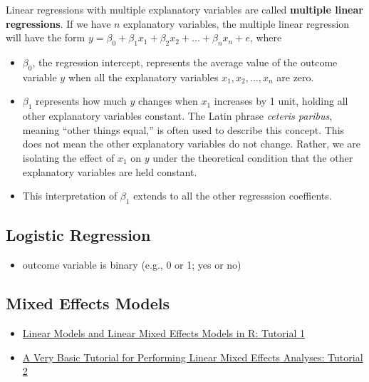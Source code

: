 \documentclass[]{book}
\providecommand{\tightlist}{%
  \setlength{\itemsep}{0pt}\setlength{\parskip}{0pt}}
\begin{document}
Linear regressions with multiple explanatory variables are called \textbf{multiple linear regressions}. If we have \(n\) explanatory variables, the multiple linear regression will have the form \(y=\beta_0 + \beta_1 x_1 + \beta_2 x_2 + ... + \beta_n x_n + e\), where

\begin{itemize}
\tightlist
\item
  \(\beta_0\), the regression intercept, represents the average value of the outcome variable \(y\) when all the explanatory variables \(x_1, x_2,...,x_n\) are zero.
\item
  \(\beta_1\) represents how much \(y\) changes when \(x_1\) increases by 1 unit, holding all other explanatory variables constant. The Latin phrase \emph{ceteris paribus}, meaning ``other things equal,'' is often used to describe this concept. This does not mean the other explanatory variables do not change. Rather, we are isolating the effect of \(x_1\) on \(y\) under the theoretical condition that the other explanatory variables are held constant.
\item
  This interpretation of \(\beta_1\) extends to all the other regresssion coeffients.
\end{itemize}

\hypertarget{logistic-regression}{%
\subsection{Logistic Regression}\label{logistic-regression}}

\begin{itemize}
\tightlist
\item
  outcome variable is binary (e.g., 0 or 1; yes or no)
\end{itemize}

\hypertarget{mixed-effects-models}{%
\subsection{Mixed Effects Models}\label{mixed-effects-models}}

\begin{itemize}
\tightlist
\item
  \href{http://www.bodowinter.com/tutorial/bw_anova_general.pdf}{Linear Models and Linear Mixed Effects Models in R: Tutorial 1}
\item
  \href{http://www.bodowinter.com/tutorial/bw_LME_tutorial2.pdf}{A Very Basic Tutorial for Performing Linear Mixed Effects Analyses: Tutorial 2}
\end{itemize}
\end{document}
